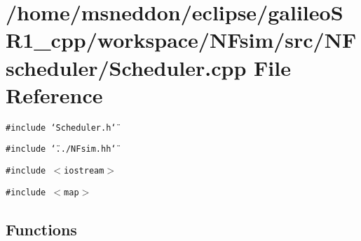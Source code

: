 \section{/home/msneddon/eclipse/galileoSR1\_\-cpp/workspace/NFsim/src/NFscheduler/Scheduler.cpp File Reference}
\label{Scheduler_8cpp}


{\tt \#include \char`\"{}Scheduler.h\char`\"{}}\par
{\tt \#include \char`\"{}../NFsim.hh\char`\"{}}\par
{\tt \#include $<$iostream$>$}\par
{\tt \#include $<$map$>$}\par
\subsection*{Functions}
